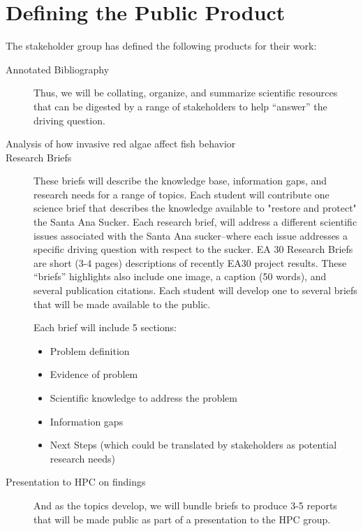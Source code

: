 \documentclass{tufte-handout}\usepackage[]{graphicx}\usepackage[]{color}
\begin{document}
\section{Defining the Public Product}

The stakeholder group has defined the following products for their work:

\begin{description}
  \item[Annotated Bibliography] Thus, we will be collating, organize, and summarize scientific resources that can be digested by a range of stakeholders to help ``answer'' the driving question. 
  \item[Analysis of how invasive red algae affect fish behavior]
  \item[Research Briefs] These briefs will describe the knowledge base, information gaps, and research needs for a range of topics. Each student will contribute one science brief that describes the knowledge available to "restore and protect" the Santa Ana Sucker. Each research brief, will address a different scientific issues associated with the Santa Ana sucker--where each issue addresses a specific driving question with respect to the sucker. EA 30 Research Briefs are short (3-4 pages) descriptions of recently EA30 project results. These ``briefs'' highlights also include one image, a caption (50 words), and several publication citations. Each student will develop one to several briefs that will be made available to the public.
  
Each brief will include 5 sections:

\begin{itemize}
  \item Problem definition
  \item Evidence of problem
  \item Scientific knowledge to address the problem
  \item Information gaps
  \item Next Steps (which could be translated by stakeholders as potential research needs)
\end{itemize}

  \item[Presentation to HPC on findings] And as the topics develop, we will bundle briefs to produce 3-5 reports that will be made public as part of a presentation to the HPC group.
\end{description}
\end{document}
